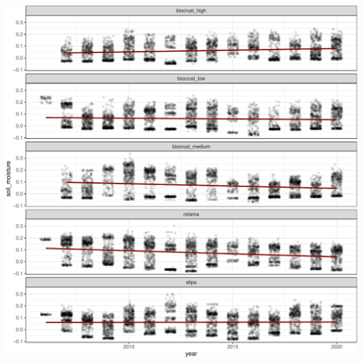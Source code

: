 \documentclass[]{article}
\begin{document}
\includegraphics{moiscrust_files/figure-latex/unnamed-chunk-40-1.pdf}
\end{document}
